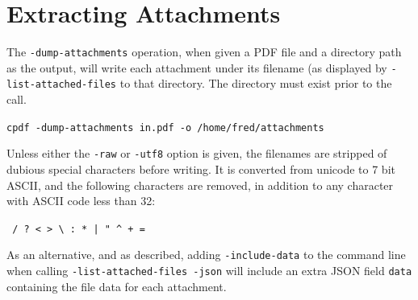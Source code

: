 \documentclass{book}
\begin{document}
\section{Extracting Attachments}

The \texttt{-dump-attachments} operation, when given a PDF file and a directory path as the output, will write each attachment under its filename (as displayed by \texttt{-list-attached-files} to that directory. The directory must exist prior to the call.

  \begin{framed}
    \noindent\small\verb!cpdf -dump-attachments in.pdf -o /home/fred/attachments!
  \end{framed}

\noindent  Unless either the \texttt{-raw} or \texttt{-utf8} option is given, the filenames are stripped of dubious special characters before writing. It is converted from unicode to 7 bit ASCII, and the following characters are removed, in addition to any character with ASCII code less than 32:

  \begin{framed}
  \centering
  \verb! / ? < > \ : * | " ^ + =!
  \end{framed}

\noindent As an alternative, and as described, adding \texttt{-include-data} to the command line when calling \texttt{-list-attached-files -json} will include an extra JSON field \texttt{data} containing the file data for each attachment. 

\ \ \ 
\end{document}
